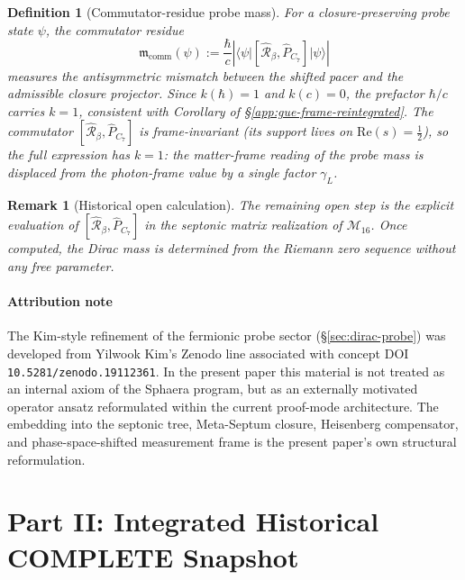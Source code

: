 \documentclass[12pt,a4paper]{article}
\newtheorem{definition}[theorem]{Definition}
\newtheorem*{remark}{Remark}
\newcommand{\gL}{\gamma_L}
\begin{document}
\begin{definition}[Commutator-residue probe mass]
For a closure-preserving probe state $\psi$, the commutator residue
\[
  \mathfrak{m}_{\mathrm{comm}}(\psi)
  := \frac{\hbar}{c}
     \left|
     \bigl\langle\psi\big|
     [\hat{\mathcal{R}}_\beta,\hat P_{C_7}]
     \big|\psi\bigr\rangle
     \right|
\]
measures the antisymmetric mismatch between the shifted pacer and the
admissible closure projector.
Since $k(\hbar)=1$ and $k(c)=0$, the prefactor $\hbar/c$ carries
$k=1$, consistent with Corollary of \S\ref{app:gue-frame-reintegrated}.
The commutator $[\hat{\mathcal{R}}_\beta,\hat P_{C_7}]$ is
frame-invariant (its support lives on $\mathrm{Re}(s)=\tfrac{1}{2}$),
so the full expression has $k=1$: the matter-frame reading of the probe
mass is displaced from the photon-frame value by a single factor $\gL$.
\end{definition}

\begin{remark}[Historical open calculation]
The remaining open step is the explicit evaluation of
$[\hat{\mathcal{R}}_\beta,\hat P_{C_7}]$ in the septonic matrix
realization of $\mathcal{M}_{16}$.
Once computed, the Dirac mass is determined from the Riemann zero
sequence without any free parameter.
\end{remark}

\subsection{Attribution note}
\label{app:attribution-reintegrated}

The Kim-style refinement of the fermionic probe sector
(\S\ref{sec:dirac-probe}) was developed from Yilwook Kim's Zenodo line
associated with concept DOI \texttt{10.5281/zenodo.19112361}.
In the present paper this material is not treated as an internal axiom
of the Sphaera program, but as an externally motivated operator ansatz
reformulated within the current proof-mode architecture.
The embedding into the septonic tree, Meta-Septum closure, Heisenberg
compensator, and phase-space-shifted measurement frame is the present
paper's own structural reformulation.





\clearpage
\part*{Part II: Integrated Historical COMPLETE Snapshot}
\end{document}
